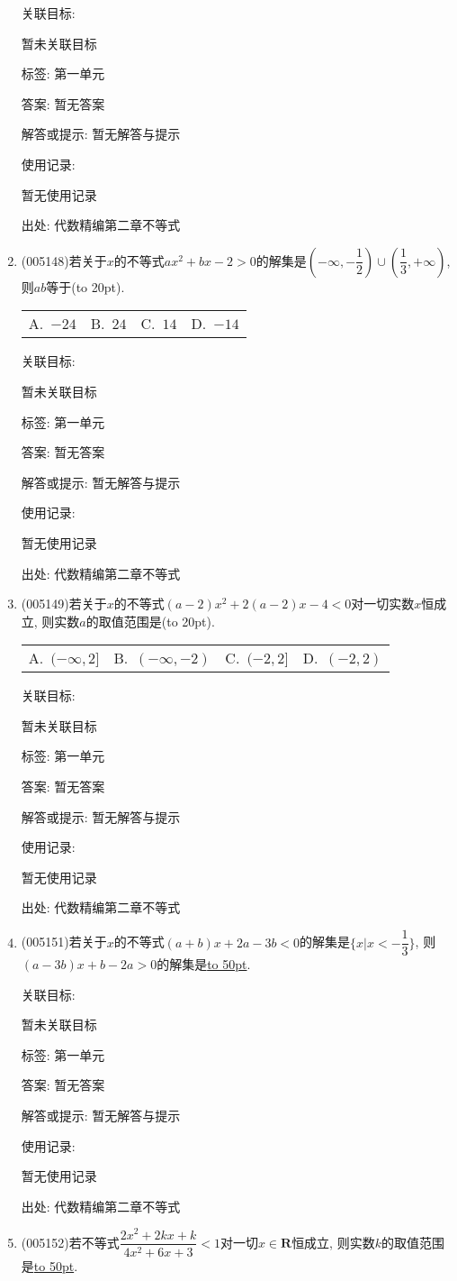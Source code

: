 \documentclass[10pt,a4paper]{article}
\newcommand{\blank}[1]{\underline{\hbox to #1pt{}}}
\newcommand{\bracket}[1]{(\hbox to #1pt{})}
\newcommand{\fourch}[4]{\par\begin{tabular}{p{.23\textwidth}p{.23\textwidth}p{.23\textwidth}p{.23\textwidth}}
A.~#1 &B.~#2& C.~#3& D.~#4
\end{tabular}}
\begin{document}
\begin{enumerate}[1.]
关联目标:

暂未关联目标



标签: 第一单元

答案: 暂无答案

解答或提示: 暂无解答与提示

使用记录:

暂无使用记录


出处: 代数精编第二章不等式
\item { (005148)}若关于$x$的不等式$ax^2+bx-2>0$的解集是$(-\infty ,-\dfrac 12)\cup (\dfrac 13,+\infty)$, 则$ab$等于\bracket{20}.
\fourch{$-24$}{$24$}{$14$}{$-14$}


关联目标:

暂未关联目标



标签: 第一单元

答案: 暂无答案

解答或提示: 暂无解答与提示

使用记录:

暂无使用记录


出处: 代数精编第二章不等式
\item { (005149)}若关于$x$的不等式$(a-2)x^2+2(a-2)x-4<0$对一切实数$x$恒成立, 则实数$a$的取值范围是\bracket{20}.
\fourch{$(-\infty ,2]$}{$(-\infty,-2)$}{$(-2,2]$}{$(-2,2)$}


关联目标:

暂未关联目标



标签: 第一单元

答案: 暂无答案

解答或提示: 暂无解答与提示

使用记录:

暂无使用记录


出处: 代数精编第二章不等式
\item { (005151)}若关于$x$的不等式$(a+b)x+2a-3b<0$的解集是$\{x|x<-\dfrac 13\}$, 则$(a-3b)x+b-2a>0$的解集是\blank{50}.


关联目标:

暂未关联目标



标签: 第一单元

答案: 暂无答案

解答或提示: 暂无解答与提示

使用记录:

暂无使用记录


出处: 代数精编第二章不等式
\item { (005152)}若不等式$\dfrac{2x^2+2kx+k}{4x^2+6x+3}<1$对一切$x\in \mathbf{R}$恒成立, 则实数$k$的取值范围是\blank{50}.



\end{enumerate}
\end{document}
